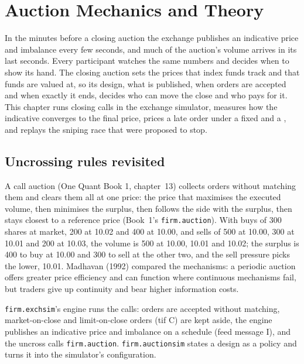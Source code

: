 \chapter{Auction Mechanics and Theory}\label{ch:mx:auction-mechanics-and-theory}

In the minutes before a closing auction the exchange publishes an indicative price and imbalance every few seconds, and much of the auction's volume
arrives in its last seconds. Every participant watches the same numbers and decides when to show its hand. The closing auction sets the prices that
index funds track and that funds are valued at, so its design, what is published, when orders are accepted and when exactly it ends, decides who can
move the close and who pays for it. This chapter runs closing calls in the exchange simulator, measures how the indicative converges to the final
price, prices a late order under a fixed and a , and replays the sniping race that  were proposed to stop.

\section{Uncrossing rules revisited}

A call auction (One Quant Book 1, chapter~13) collects orders without matching them and clears them all at one price: the price that maximises the
executed volume, then minimises the surplus, then follows the side with the surplus, then stays closest to a reference price (Book~1's
\texttt{firm.auction}). With buys of 300 shares at market, 200 at 10.02 and 400 at 10.00, and sells of 500 at 10.00, 300 at 10.01 and 200 at 10.03, the volume
is 500 at 10.00, 10.01 and 10.02; the surplus is 400 to buy at 10.00 and 300 to sell at the other two, and the sell pressure picks the lower, 10.01.
Madhavan (1992) compared the mechanisms: a periodic auction offers greater price efficiency and can function where continuous mechanisms fail, but traders
give up continuity and bear higher information costs.

\texttt{firm.exchsim}'s engine runs the calls: orders are accepted without matching, market-on-close and limit-on-close orders (tif C) are kept aside, the
engine publishes an indicative price and imbalance on a schedule (feed message I), and the uncross calls \texttt{firm.auction}. \texttt{firm.auctionsim}
states a design as a policy and turns it into the simulator's configuration.

